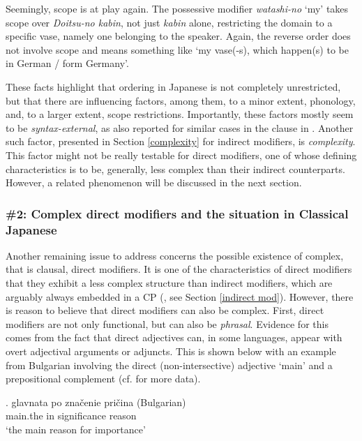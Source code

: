 Seemingly, scope is at play again. The possessive modifier \textit{watashi-no} `my’ takes scope over \textit{Doitsu-no kabin}, not just \textit{kabin} alone, restricting the domain to a specific vase, namely one belonging to the speaker. Again, the reverse order does not involve scope and means something like `my vase(-s), which happen(s) to be in German / form Germany’.

These facts highlight that ordering in Japanese is not completely unrestricted, but that there are influencing factors, among them, to a minor extent, phonology, and, to a larger extent, scope restrictions. Importantly, these factors mostly seem to be \textit{syntax-external}, as also reported for similar cases in the clause in \citet{ramchand:2014:deriving}. Another such factor, presented in Section \ref{complexity} for indirect modifiers, is \textit{complexity}. This factor might not be really testable for direct modifiers, one of whose defining characteristics is to be, generally, less complex than their indirect counterparts. However, a related phenomenon will be discussed in the next section.

\subsubsection{\#2: Complex direct modifiers and the situation in Classical Japanese} \label{complexdirect}
\largerpage

Another remaining issue to address concerns the possible existence of complex, that is clausal, direct modifiers. It is one of the characteristics of direct modifiers that they exhibit a less complex structure than indirect modifiers, which are arguably always embedded in a CP (\citealt{cinque:2010:adj, cinque:2020:relcl}, see Section \ref{indirect mod}). However, there is reason to believe that direct modifiers can also be complex. First, direct modifiers are not only functional, but can also be \textit{phrasal}. Evidence for this comes from the fact that direct adjectives can, in some languages, appear with overt adjectival arguments or adjuncts. This is shown below with an example from Bulgarian involving the direct (non-intersective) adjective `main’ and a prepositional complement (cf. \citealt[§ 4.1.2]{cinque:2010:adj} for more data). 

\exg. glavnata po zna\v{c}enie pri\v{c}ina (Bulgarian)\\
main.the in significance reason\\
`the main reason for importance’ \null \hfill \citep[47]{cinque:2010:adj}


